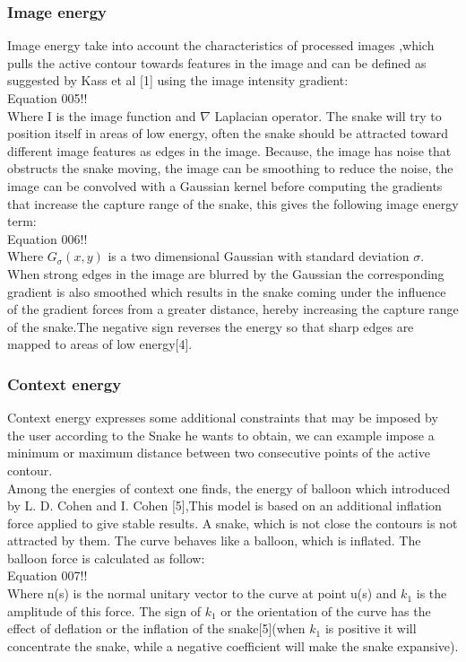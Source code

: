 \subsubsection{Image energy}
\hspace{1cm}Image energy take into account the characteristics of processed images ,which
pulls the active contour towards features in the image and can be defined as
suggested by Kass et al [1] using the image intensity gradient:\\
Equation 005!!\\
Where I is the image function and $\nabla$ Laplacian operator.
The snake will try to position itself in areas of low energy, often the snake
should be attracted toward different image features as edges in the image.
Because, the image has noise that obstructs the snake moving, the image can
be smoothing to reduce the noise, the image can be convolved with a Gaussian
kernel before computing the gradients that increase the capture range of the snake, this gives the following
image energy term:\\
Equation 006!!\\
Where $G_\sigma(x, y)$ is a two dimensional Gaussian with standard deviation $\sigma$. When
strong edges in the image are blurred by the Gaussian the corresponding
gradient is also smoothed which results in the snake coming under the
influence of the gradient forces from a greater distance, hereby increasing the
capture range of the snake.The negative sign reverses the energy so that sharp
edges are mapped to areas of low energy[4].
\subsubsection{Context energy}
\hspace{1cm}Context energy expresses some additional constraints that may be imposed by
the user according to the Snake he wants to obtain, we can example impose a
minimum or maximum distance between two consecutive points of the active
contour.\\
Among the energies of context one finds, the energy of balloon which
introduced by L. D. Cohen and I. Cohen [5],This model is based on an additional
inflation force applied to give stable results. A snake, which is not close the
contours is not attracted by them. The curve behaves like a balloon, which is
inflated. The balloon force is calculated as follow:\\
Equation 007!!\\
Where n(s) is the normal unitary vector to the curve at point u(s) and $k_1$ is the
amplitude of this force. The sign of $k_1$ or the orientation of the curve has the
effect of deflation or the inflation of the snake[5](when $k_1$ is positive it will
concentrate the snake, while a negative coefficient will make the snake
expansive).
